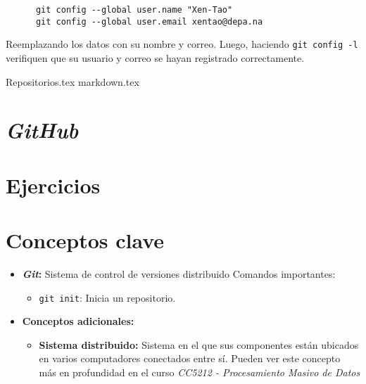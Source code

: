     \begin{verbatim}
      git config --global user.name "Xen-Tao"
      git config --global user.email xentao@depa.na
    \end{verbatim}

    Reemplazando los datos con su nombre y correo.
    Luego, haciendo \texttt{git config -l} verifiquen que su usuario y correo se
    hayan registrado correctamente.

  {Repositorios.tex}
  {markdown.tex}
  \section{\textit{GitHub}}
    \label{sec:github}

  \section{Ejercicios}
  \section{Conceptos clave}
    \begin{itemize}
      \item \textbf{\textit{Git}:} Sistema de control de versiones distribuido
        Comandos importantes:
        \begin{itemize}
          \item \texttt{git init}: Inicia un repositorio.
        \end{itemize}
      \item \textbf{Conceptos adicionales:}
        \begin{itemize}
          \item \textbf{Sistema distribuido:\label{kw:distr-sist}}
            Sistema en el que sus componentes están ubicados en varios computadores 
            conectados entre sí.
            Pueden ver este concepto más en profundidad en el curso \textit{CC5212 - 
            Procesamiento Masivo de Datos}
        \end{itemize} 
    \end{itemize}
  \nocite{*}
  \printbibliography[keyword=git]
%